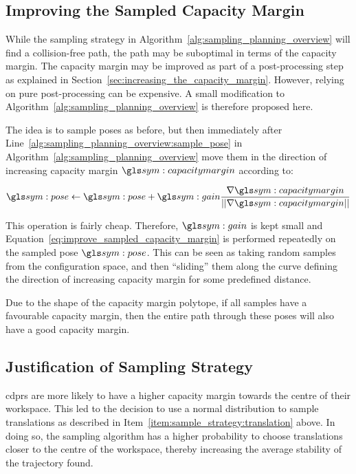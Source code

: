 	\subsection{Improving the Sampled Capacity Margin}%
	\label{sec:improving_the_sampled_capacity_margin}

		While the sampling strategy in
		Algorithm~\ref{alg:sampling_planning_overview} will find a
		collision-free path, the path may be suboptimal in terms of the capacity
		margin. The capacity margin may be improved as part of a post-processing
		step as explained in Section~\ref{sec:increasing_the_capacity_margin}.
		However, relying on pure post-processing can be expensive. A small
		modification to Algorithm~\ref{alg:sampling_planning_overview} is
		therefore proposed here.

		The idea is to sample poses as before, but then immediately after
		Line~\ref{alg:sampling_planning_overview:sample_pose} in
		Algorithm~\ref{alg:sampling_planning_overview} move them in the
		direction of increasing capacity margin $\capacitymargin$ according to:

		\begin{equation}
			\pose \gets \pose +
				\gain\frac
				{%
					\nabla\capacitymargin
				}
				{%
					\norm
					{%
						\nabla\capacitymargin
					}
				}
			\label{eq:improve_sampled_capacity_margin}
		\end{equation}

		This operation is fairly cheap. Therefore, $\gain$ is kept small and
		Equation~\ref{eq:improve_sampled_capacity_margin} is performed
		repeatedly on the sampled pose $\pose$. This can be seen as taking
		random samples from the configuration space, and then ``sliding'' them
		along the curve defining the direction of increasing capacity margin for
		some predefined distance.

		Due to the shape of the capacity margin polytope, if all samples have a
		favourable capacity margin, then the entire path through these poses
		will also have a good capacity margin.

	\subsection{Justification of Sampling Strategy}%
	\label{sec:justification_of_sampling_strategy}

		\glspl{cdpr} are more likely to have a higher capacity margin towards
		the centre of their workspace. This led to the decision to use a normal
		distribution to sample translations as described in
		Item~\ref{item:sample_strategy:translation} above. In doing so, the
		sampling algorithm has a higher probability to choose translations
		closer to the centre of the workspace, thereby increasing the average
		stability of the trajectory found.

